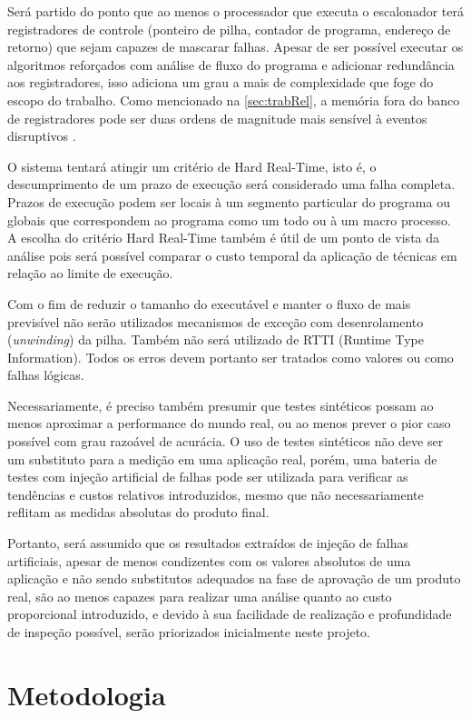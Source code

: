 Será partido do ponto que ao menos o processador que executa o escalonador terá registradores de controle (ponteiro de pilha, contador de programa, endereço de retorno) que sejam capazes de mascarar falhas. Apesar de ser possível executar os algoritmos reforçados com análise de fluxo do programa e adicionar redundância aos registradores, isso adiciona um grau a mais de complexidade que foge do escopo do trabalho. Como mencionado na \autoref{sec:trabRel}, a memória fora do banco de registradores pode ser duas ordens de magnitude mais sensível à eventos disruptivos \cite{ReliabilityArmCortexUnderHeavyIons}.

O sistema tentará atingir um critério de Hard Real-Time, isto é, o descumprimento de um prazo de execução será considerado uma falha completa. Prazos de execução podem ser locais à um segmento particular do programa ou globais que correspondem ao programa como um todo ou à um macro processo. A escolha do critério Hard Real-Time também é útil de um ponto de vista da análise pois será possível comparar o custo temporal da aplicação de técnicas em relação ao limite de execução.

Com o fim de reduzir o tamanho do executável e manter o fluxo de mais previsível não serão utilizados mecanismos de exceção com desenrolamento (\textit{unwinding}) da pilha. Também não será utilizado de RTTI (Runtime Type Information). Todos os erros devem portanto ser tratados como valores ou como falhas lógicas.

Necessariamente, é preciso também presumir que testes sintéticos possam ao menos aproximar a performance do mundo real, ou ao menos prever o pior caso possível com grau razoável de acurácia. O uso de testes sintéticos não deve ser um substituto para a medição em uma aplicação real, porém, uma bateria de testes com injeção artificial de falhas pode ser utilizada para verificar as tendências e custos relativos introduzidos, mesmo que não necessariamente reflitam as medidas absolutas do produto final.

Portanto, será assumido que os resultados extraídos de injeção de falhas artificiais, apesar de menos condizentes com os valores absolutos de uma aplicação e não sendo substitutos adequados na fase de aprovação de um produto real, são ao menos capazes para realizar uma análise quanto ao custo proporcional introduzido, e devido à sua facilidade de realização e profundidade de inspeção possível, serão priorizados inicialmente neste projeto.

\section{Metodologia}

